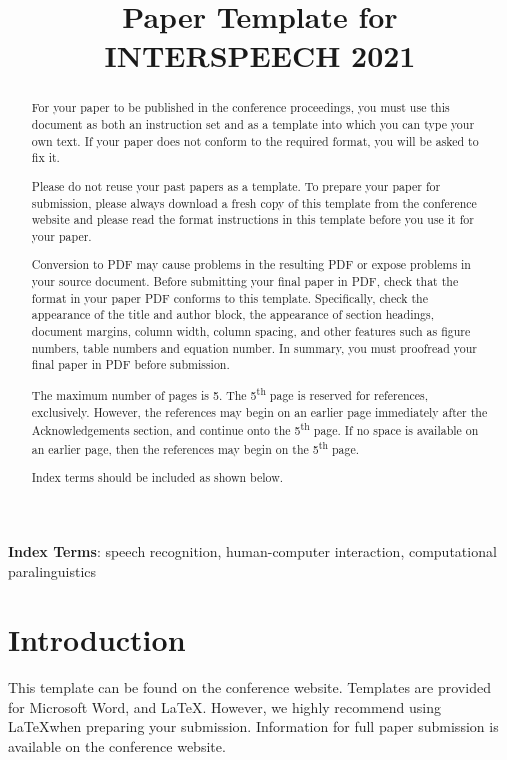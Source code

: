\documentclass[a4paper]{article}
\title{Paper Template for INTERSPEECH 2021}
\begin{document}
\maketitle
% 
\begin{abstract}
  For your paper to be published in the conference proceedings, you must use this document as both an instruction set and as a template into which you can type your own text. If your paper does not conform to the required format, you will be asked to fix it.

  Please do not reuse your past papers as a template. To prepare your paper for submission, please always download a fresh copy of this template from the conference website and please read the format instructions in this template before you use it for your paper.

  Conversion to PDF may cause problems in the resulting PDF or expose problems in your source document. Before submitting your final paper in PDF, check that the format in your paper PDF conforms to this template. Specifically, check the appearance of the title and author block, the appearance of section headings, document margins, column width, column spacing, and other features such as figure numbers, table numbers and equation number. In summary, you must proofread your final paper in PDF before submission.
  
  The maximum number of pages is 5. The 5\textsuperscript{th} page is reserved for references, exclusively. However, the references may begin on an earlier page immediately after the Acknowledgements section, and continue onto the 5\textsuperscript{th} page. If no space is available on an earlier page, then the references may begin on the 5\textsuperscript{th} page.

  Index terms should be included as shown below.
\end{abstract}
\noindent\textbf{Index Terms}: speech recognition, human-computer interaction, computational paralinguistics

\section{Introduction}

This template can be found on the conference website. Templates are provided for Microsoft Word\textregistered, and \LaTeX. However, we highly recommend using \LaTeX when preparing your submission. Information for full paper submission is available on the conference website.
\end{document}
